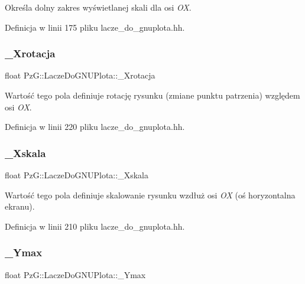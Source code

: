 Określa dolny zakres wyświetlanej skali dla osi {\itshape OX}. 

Definicja w linii 175 pliku lacze\+\_\+do\+\_\+gnuplota.\+hh.

\mbox{\label{class_pz_g_1_1_lacze_do_g_n_u_plota_a21e77f0a2bfb7fed989b6dc2d64b5a7e}} 
\subsubsection{\texorpdfstring{\_Xrotacja}{\_Xrotacja}}
{\footnotesize\ttfamily float Pz\+G\+::\+Lacze\+Do\+G\+N\+U\+Plota\+::\+\_\+\+Xrotacja\hspace{0.3cm}{\ttfamily [protected]}}

Wartość tego pola definiuje rotację rysunku (zmiane punktu patrzenia) względem osi {\itshape OX}. 

Definicja w linii 220 pliku lacze\+\_\+do\+\_\+gnuplota.\+hh.

\mbox{\label{class_pz_g_1_1_lacze_do_g_n_u_plota_a2c9303c4dbb4c9f0ddc4f1fe02eb3f70}} 
\subsubsection{\texorpdfstring{\_Xskala}{\_Xskala}}
{\footnotesize\ttfamily float Pz\+G\+::\+Lacze\+Do\+G\+N\+U\+Plota\+::\+\_\+\+Xskala\hspace{0.3cm}{\ttfamily [protected]}}

Wartość tego pola definiuje skalowanie rysunku wzdłuż osi {\itshape OX} (oś horyzontalna ekranu). 

Definicja w linii 210 pliku lacze\+\_\+do\+\_\+gnuplota.\+hh.

\mbox{\label{class_pz_g_1_1_lacze_do_g_n_u_plota_ad7dfd3fad82ea0720ec89eacc18410bf}} 
\subsubsection{\texorpdfstring{\_Ymax}{\_Ymax}}
{\footnotesize\ttfamily float Pz\+G\+::\+Lacze\+Do\+G\+N\+U\+Plota\+::\+\_\+\+Ymax\hspace{0.3cm}{\ttfamily [protected]}}

